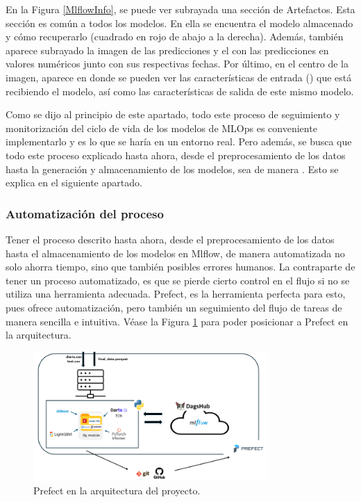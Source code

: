 En la Figura \ref{MlflowInfo}, se puede ver subrayada una sección de Artefactos. Esta sección es común a todos los modelos. En ella se encuentra el modelo almacenado y cómo recuperarlo (cuadrado en rojo de abajo a la derecha). Además, también aparece subrayado la imagen  de las predicciones y el  con las predicciones en valores numéricos junto con sus respectivas fechas. Por último, en el centro de la imagen, aparece en  donde se pueden ver las características de entrada () que está recibiendo el modelo, así como las características de salida  de este mismo modelo.

Como se dijo al principio de este apartado, todo este proceso de seguimiento y monitorización del ciclo de vida de los modelos de MLOps es conveniente implementarlo y es lo que se haría en un entorno real. Pero además, se busca que todo este proceso explicado hasta ahora, desde el preprocesamiento de los datos hasta la generación y almacenamiento de los modelos, sea de manera . Esto se explica en el siguiente apartado.

\subsubsection{Automatización del proceso}
Tener el proceso descrito hasta ahora, desde el preprocesamiento de los datos hasta el almacenamiento de los modelos en Mlflow, de manera automatizada no solo ahorra tiempo, sino que también posibles errores humanos. La contraparte de tener un proceso automatizado, es que se pierde cierto control en el flujo si no se utiliza una herramienta adecuada. Prefect, es la herramienta perfecta para esto, pues ofrece automatización, pero también un seguimiento del flujo de tareas de manera sencilla e intuitiva. Véase la Figura \ref{Prefect} para poder posicionar a Prefect en la arquitectura.

\begin{figure}[H]
    \centering
    \includegraphics[width = 0.8\textwidth]{imgs/prefect.png}
    \caption{Prefect en la arquitectura del proyecto.}
    \label{Prefect}
\end{figure}

